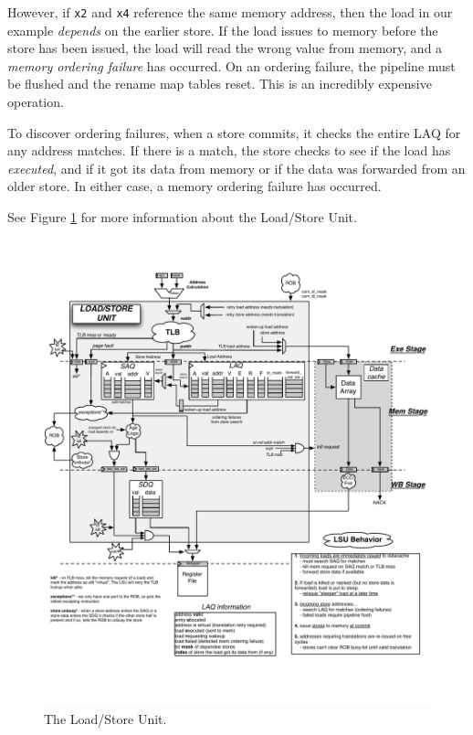 However, if {\tt x2} and {\tt x4} reference the same memory address, then the load in our example {\em depends} on the earlier store.  If the load issues to memory before the store has been issued, the load will read the wrong value from memory, and a {\em memory ordering failure} has occurred.  On an ordering failure, the pipeline must be flushed and the rename map tables reset.  This is an incredibly expensive operation.

To discover ordering failures, when a store commits, it checks the entire LAQ for any address matches.  If there is a match, the store checks to see if the load has {\em executed}, and if it got its data from memory or if the data was forwarded from an older store.  In either case, a memory ordering failure has occurred.  

See Figure \ref{fig:lsu} for more information about the Load/Store Unit.

\


\begin{figure}[ht]
	\centering
	\centerline{\includegraphics[scale =.9] {figures/lsu}}
	\caption{ \small The Load/Store Unit.}
	\label{fig:lsu}
\end{figure}
